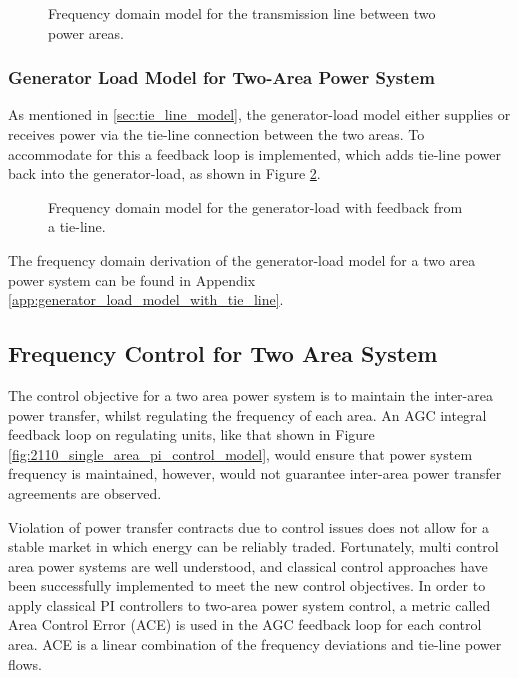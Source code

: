 \begin{figure}[h]
	\centering
	
	\caption[Frequency domain model for a transmission line]{Frequency domain model for the transmission line between two power areas.}
	\label{fig:2112_tie_line_model}
\end{figure}

\subsubsection{Generator Load Model for Two-Area Power System}
As mentioned in \textsection \ref{sec:tie_line_model}, the generator-load model either supplies or receives power via the tie-line connection between the two areas. To accommodate for this a feedback loop is implemented, which adds tie-line power back into the generator-load, as shown in Figure \ref{fig:2113_generator_load_model_1_with_tie_line}.

\begin{figure}[h]
	\centering
	
	\caption[Frequency domain model for generator-load with tie-line connection]{Frequency domain model for the generator-load with feedback from a tie-line.}
	\label{fig:2113_generator_load_model_1_with_tie_line}
\end{figure}

The frequency domain derivation of the generator-load model for a two area power system can be found in Appendix \ref{app:generator_load_model_with_tie_line}.


\subsection{Frequency Control for Two Area System} \label{ssec:control_two_area_system}
The control objective for a two area power system is to maintain the inter-area power transfer, whilst regulating the frequency of each area. An AGC integral feedback loop on regulating units, like that shown in Figure \ref{fig:2110_single_area_pi_control_model}, would ensure that power system frequency is maintained, however, would not guarantee inter-area power transfer agreements are observed.

Violation of power transfer contracts due to control issues does not allow for a stable market in which energy can be reliably traded. Fortunately, multi control area power systems are well understood, and classical control approaches have been successfully implemented to meet the new control objectives. In order to apply classical PI controllers to two-area power system control, a metric called Area Control Error (ACE) is used in the AGC feedback loop for each control area. ACE is a linear combination of the frequency deviations and tie-line power flows.

